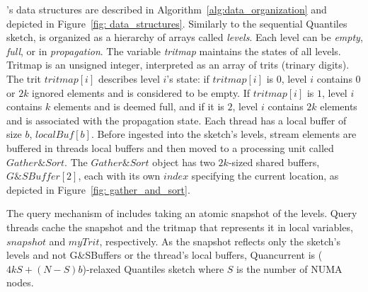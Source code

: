\mysketch's data structures are described in Algorithm~\ref{alg:data_organization} and depicted in Figure~\ref{fig: data_structures}.
Similarly to the sequential Quantiles sketch, \mysketch is organized as a hierarchy of arrays called \emph{levels}. Each level can be \emph{empty}, \emph{full}, or in \emph{propagation}. The variable \emph{tritmap} maintains the states of all levels. Tritmap is an unsigned integer, interpreted as an array of trits (trinary digits). The trit $tritmap[i]$ describes level $i$'s state: if $tritmap[i]$ is $0$, level $i$ contains $0$ or $2k$ ignored elements and is considered to be empty. If $tritmap[i]$ is $1$, level $i$ contains $k$ elements and is deemed full, and if it is $2$, level $i$ contains $2k$ elements and is associated with the propagation state. Each thread has a local buffer of size $b$, $\mathit{localBuf[b]}$. Before ingested into the sketch's levels, stream elements are buffered in threads local buffers and then moved to a processing unit called $\mathit{Gather\&Sort}$. The $\mathit{Gather\&Sort}$ object has two $2k$-sized shared buffers, $\mathit{G\&SBuffer}[2]$, each with its own $\mathit{index}$ specifying the current location, as depicted in Figure~\ref{fig: gather_and_sort}. 

The query mechanism of \mysketch includes taking an atomic snapshot of the levels. Query threads cache the snapshot and the tritmap that represents it in local variables, 
$\mathit{snapshot}$ and $\mathit{myTrit}$, respectively. As the snapshot reflects only the sketch's levels and not G\&SBuffers or the thread's local buffers, Quancurrent is ($4kS+(N-S)b$)-relaxed Quantiles sketch where $S$ is the number of NUMA nodes. 


